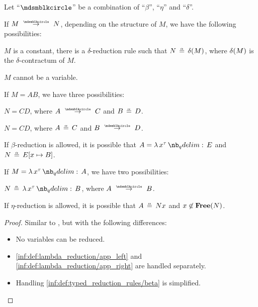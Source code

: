 \begin{lemma}\label{thm:single_step_reduction_deconstruction}
  Let \enquote{\( {\Anon} \)} be a combination of \enquote{\( \beta \)}, \enquote{\( \eta \)} and \enquote{\( \delta \)}.

  If \( M \pred N \), depending on the structure of \( M \), we have the following possibilities:
  \begin{thmenum}
     \( M \) is a constant, there is a \( \delta \)-reduction rule such that \( N \aequiv \op*{\delta}(M) \), where \( \op*{\delta}(M) \) is the \( \delta \)-contractum of \( M \).

     \( M \) cannot be a variable.

     If \( M = AB \), we have three possibilities:
    \begin{thmenum}
       \( N = CD \), where \( A \pred C \) and \( B \aequiv D \).

       \( N = CD \), where \( A \aequiv C \) and \( B \pred D \).

       If \( \beta \)-reduction is allowed, it is possible that \( A = \qabs {x^\tau} E \) and \( N \aequiv E[x \mapsto B] \).
    \end{thmenum}

     If \( M = \qabs {x^\tau} A \), we have two possibilities:
    \begin{thmenum}
       \( N \aequiv \qabs {x^\tau} B \), where \( A \pred B \).

       If \( \eta \)-reduction is allowed, it is possible that \( A \aequiv Nx \) and \( x \not\in \op*{Free}(N) \).
    \end{thmenum}
  \end{thmenum}
\end{lemma}
\begin{proof}
  Similar to , but with the following differences:
  \begin{itemize}
    \item No variables can be reduced.
    \item \ref{inf:def:lambda_reduction/app_left} and \ref{inf:def:lambda_reduction/app_right} are handled separately.
    \item Handling \ref{inf:def:typed_reduction_rules/beta} is simplified.
  \end{itemize}
\end{proof}

